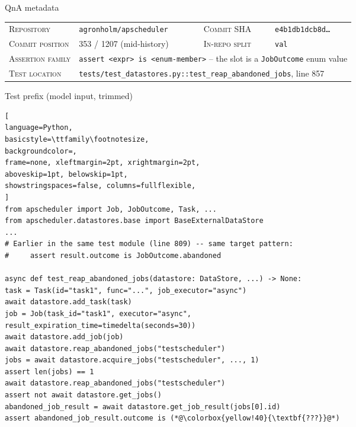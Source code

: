 \documentclass{llmxive}
\begin{document}
\begin{figure}[!htbp]
\begin{center}
\begin{tcolorbox}[
enhanced,
colback=white, colframe=qexHead, coltitle=white,
fonttitle=\bfseries,
title={Detailed qualitative example: \texttt{agronholm/apscheduler} (IR test, commit-derived)},
arc=3pt, boxrule=0.6pt,
top=3pt, bottom=3pt, left=6pt, right=6pt,
]

\begin{qexsection}{QnA metadata}
\footnotesize
\begin{tabular}{@{}l@{\;\;}l@{\hskip 14pt}l@{\;\;}l@{}}
\textsc{Repository}      & \texttt{agronholm/apscheduler}              & \textsc{Commit SHA}        & \texttt{e4b1db1dcb8d\ldots} \\
\textsc{Commit position} & 353 / 1207 (mid-history)                    & \textsc{In-repo split}     & \texttt{val} \\
\textsc{Assertion family} & \multicolumn{3}{l}{\texttt{assert <expr> is <enum-member>} -- the slot is a \texttt{JobOutcome} enum value} \\
\textsc{Test location}   & \multicolumn{3}{l}{\texttt{tests/test\_datastores.py::test\_reap\_abandoned\_jobs}, line 857} \\
\end{tabular}
\end{qexsection}

\begin{qexsection}{Test prefix (model input, trimmed)}
\begin{lstlisting}[
language=Python,
basicstyle=\ttfamily\footnotesize,
backgroundcolor=,
frame=none, xleftmargin=2pt, xrightmargin=2pt,
aboveskip=1pt, belowskip=1pt,
showstringspaces=false, columns=fullflexible,
]
from apscheduler import Job, JobOutcome, Task, ...
from apscheduler.datastores.base import BaseExternalDataStore
...
# Earlier in the same test module (line 809) -- same target pattern:
#     assert result.outcome is JobOutcome.abandoned

async def test_reap_abandoned_jobs(datastore: DataStore, ...) -> None:
task = Task(id="task1", func="...", job_executor="async")
await datastore.add_task(task)
job = Job(task_id="task1", executor="async",
result_expiration_time=timedelta(seconds=30))
await datastore.add_job(job)
await datastore.reap_abandoned_jobs("testscheduler")
jobs = await datastore.acquire_jobs("testscheduler", ..., 1)
assert len(jobs) == 1
await datastore.reap_abandoned_jobs("testscheduler")
assert not await datastore.get_jobs()
abandoned_job_result = await datastore.get_job_result(jobs[0].id)
assert abandoned_job_result.outcome is (*@\colorbox{yellow!40}{\textbf{???}}@*)
\end{lstlisting}
\end{qexsection}


\end{tcolorbox}
\end{center}
\end{figure}
\end{document}
